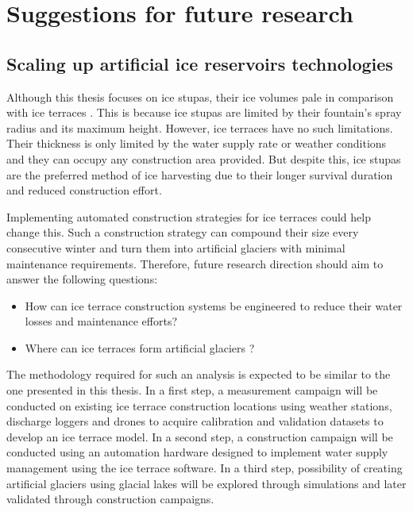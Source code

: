\section{Suggestions for future research}

\subsection{Scaling up artificial ice reservoirs technologies}

Although this thesis focuses on ice stupas, their ice volumes pale in comparison with ice terraces
\citep{nusserSociohydrologyArtificialGlaciers2019}. This is because ice stupas are limited by their fountain's
spray radius and its maximum height. However, ice terraces have no such limitations. Their thickness is only
limited by the water supply rate or weather conditions and they can occupy any construction area provided. But
despite this, ice stupas are the preferred method of ice harvesting due to their longer survival duration and
reduced construction effort.

Implementing automated construction strategies for ice terraces could help change this. Such a construction
strategy can compound their size every consecutive winter and turn them into artificial glaciers with minimal
maintenance requirements. Therefore, future research direction should aim to answer the following questions:

\begin{itemize}

  \item How can ice terrace construction systems be engineered to reduce their water losses and maintenance
    efforts?
  \item Where can ice terraces form artificial glaciers ? 

\end{itemize}

The methodology required for such an analysis is expected to be similar to the one presented in this thesis. In
a first step, a measurement campaign will be conducted on existing ice terrace construction locations using
weather stations, discharge loggers and drones to acquire calibration and validation datasets to develop an ice
terrace model. In a second step, a construction campaign will be conducted using an automation hardware designed
to implement water supply management using the ice terrace software. In a third step, possibility of creating
artificial glaciers using glacial lakes will be explored through simulations and later validated through
construction campaigns.

